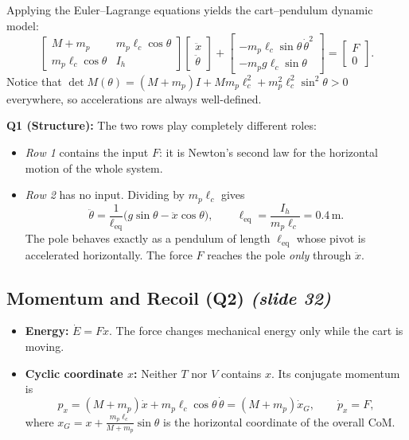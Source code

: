 \documentclass[11pt, a4paper]{article}
\theoremstyle{definition}
\theoremstyle{plain}
\begin{document}
Applying the Euler--Lagrange equations yields the cart--pendulum dynamic model:
\begin{equation}
  \begin{bmatrix} M + m_p & m_p \ell_c \cos\theta \\ m_p \ell_c \cos\theta & I_h \end{bmatrix}
  \begin{bmatrix} \ddot{x} \\ \ddot{\theta} \end{bmatrix}
  + \begin{bmatrix} -m_p \ell_c \sin\theta\,\dot{\theta}^2 \\ -m_p g \ell_c \sin\theta \end{bmatrix}
  = \begin{bmatrix} F \\ 0 \end{bmatrix}.
  \label{eq:cart_pendulum}
\end{equation}
Notice that $\det M(\theta) = (M + m_p)I + M m_p \ell_c^2 + m_p^2 \ell_c^2 \sin^2\theta > 0$ everywhere, so accelerations are always well-defined.

\textbf{Q1 (Structure):} The two rows play completely different roles:
\begin{itemize}
  \item \emph{Row 1} contains the input $F$: it is Newton's second law for the horizontal motion of the whole system.
  \item \emph{Row 2} has no input. Dividing by $m_p \ell_c$ gives
  \[
    \ddot{\theta} = \frac{1}{\ell_{\text{eq}}} \big( g\sin\theta - \ddot{x}\cos\theta \big), \qquad \ell_{\text{eq}} = \frac{I_h}{m_p \ell_c} = 0.4\,\mathrm{m}.
  \]
  The pole behaves exactly as a pendulum of length $\ell_{\text{eq}}$ whose pivot is accelerated horizontally. The force $F$ reaches the pole \emph{only} through $\ddot{x}$.
\end{itemize}

\subsection{Momentum and Recoil (Q2) \emph{(slide 32)}}

\begin{itemize}
  \item \textbf{Energy:} $\dot{E} = F \dot{x}$. The force changes mechanical energy only while the cart is moving.
  \item \textbf{Cyclic coordinate $x$:} Neither $T$ nor $V$ contains $x$. Its conjugate momentum is
  \[
    p_x = (M + m_p)\dot{x} + m_p \ell_c \cos\theta\,\dot{\theta} = (M + m_p)\dot{x}_G, \qquad \dot{p}_x = F,
  \]
  where $x_G = x + \frac{m_p \ell_c}{M + m_p}\sin\theta$ is the horizontal coordinate of the overall CoM.
\end{itemize}
\end{document}
